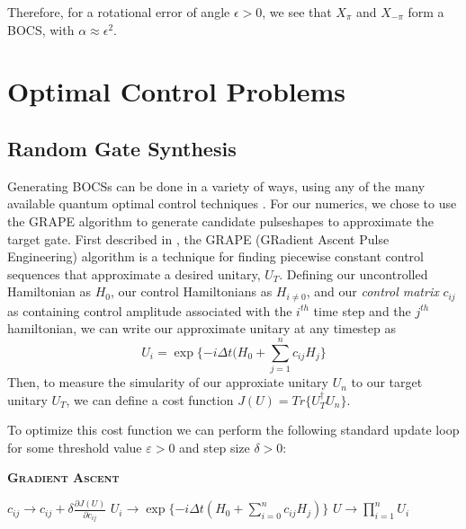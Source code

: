 \documentclass[aps,nofootinbib,pra,notitlepage,twocolumn]{revtex4-1}
\begin{document}
Therefore, for a rotational error of angle $\epsilon > 0$, we see that $X_\pi$ and  $X_{-\pi}$  form a BOCS, with $\alpha\approx\epsilon^2$.



\section{Optimal Control Problems}\label{ocp}
\subsection{Random Gate Synthesis}
Generating BOCSs can be done in a variety of ways, using any  of the many available quantum optimal control techniques \cite{Khaneja2005, Caneva2011, Machnes2018}. For our numerics, we chose to use the GRAPE algorithm to generate candidate pulseshapes to approximate the target gate. First described in \cite{Khaneja2005}, the GRAPE (GRadient Ascent Pulse Engineering) algorithm is a technique for finding piecewise constant control sequences that approximate a desired unitary, $U_T$. Defining our uncontrolled Hamiltonian as $H_0$, our control Hamiltonians as $H_{i\neq 0}$, and our \textit{control matrix} $c_{ij}$ as containing control amplitude associated with the $i^{th}$ time step and the $j^{th}$ hamiltonian, we can write our approximate unitary at any timestep as
\begin{equation}\label{eq:3}
  U_i = \exp\{-i\Delta t(H_0 + \sum_{j=1}^{n}c_{ij}H_{j}\}
\end{equation}
Then, to measure the simularity of our approxiate unitary $U_n$ to our target unitary $U_T$, we can define a cost function $J(U) = Tr\{U_T^{\dagger}U_n\}$.

To optimize this cost function we can perform the following standard update loop for some threshold value $\varepsilon > 0$ and step size $\delta > 0$:
\begin{algorithm}[H]
  \caption{\textsc{\textbf{Gradient Ascent}}}
  \begin{algorithmic}
    \State $c_{ij} \rightarrow c_{ij} + \delta\frac{\partial J(U)}{\partial c_{ij}}$
    \State $U_i \rightarrow \exp\{-i\Delta t(H_0 + \sum_{i=0}^{n}c_{ij}H_j)\}$
    \EndFor
    \State $U \rightarrow \prod_{i=1}^nU_i$
    \EndWhile
  \end{algorithmic}
\end{algorithm}
\end{document}
